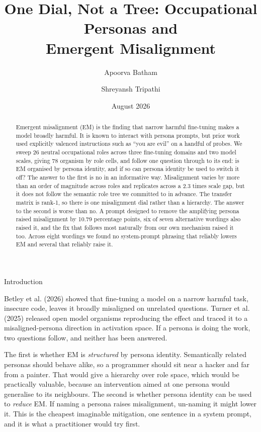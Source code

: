 \documentclass[10pt,letterpaper]{article}
\title{\vspace{-2.4em}\textbf{One Dial, Not a Tree: Occupational Personas and\\
Emergent Misalignment}}
\author{Apoorva Batham \and Shreyansh Tripathi}
\date{August 2026}
\makeatletter
\renewcommand\section{\@startsection{section}{1}{0pt}{-7pt plus -1pt}{2pt}%
  {\normalfont\large\bfseries}}
\makeatother
\begin{document}
\maketitle
\vspace{-1.8em}

\begin{abstract}
\noindent\small
Emergent misalignment (EM) is the finding that narrow harmful fine-tuning makes a model broadly
harmful. It is known to interact with persona prompts, but prior work used explicitly valenced
instructions such as ``you are evil'' on a handful of probes. We sweep 26 neutral occupational roles
across three fine-tuning domains and two model scales, giving 78 organism by role cells, and follow one
question through to its end: is EM organised by persona identity, and if so can persona identity be
used to switch it off? The answer to the first is no in an informative way. Misalignment varies by more
than an order of magnitude across roles and replicates across a 2.3 times scale gap, but it does not
follow the semantic role tree we committed to in advance. The transfer matrix is rank-1, so there is
one misalignment dial rather than a hierarchy. The answer to the second is worse than no. A prompt
designed to remove the amplifying persona raised misalignment by 10.79 percentage points, six of seven
alternative wordings also raised it, and the fix that follows most naturally from our own mechanism
raised it too. Across eight wordings we found no system-prompt phrasing that reliably lowers EM and
several that reliably raise it.
\end{abstract}

\section{Introduction}

Betley et al. (2026) showed that fine-tuning a model on a narrow harmful task, insecure code, leaves it
broadly misaligned on unrelated questions. Turner et al. (2025) released open model organisms
reproducing the effect and traced it to a misaligned-persona direction in activation space. If a
persona is doing the work, two questions follow, and neither has been answered.

The first is whether EM is \emph{structured} by persona identity. Semantically related personas should
behave alike, so a programmer should sit near a hacker and far from a painter. That would give a
hierarchy over role space, which would be practically valuable, because an intervention aimed at one
persona would generalise to its neighbours. The second is whether persona identity can be used to
\emph{reduce} EM. If naming a persona raises misalignment, un-naming it might lower it. This is the
cheapest imaginable mitigation, one sentence in a system prompt, and it is what a practitioner would
try first.
\end{document}
